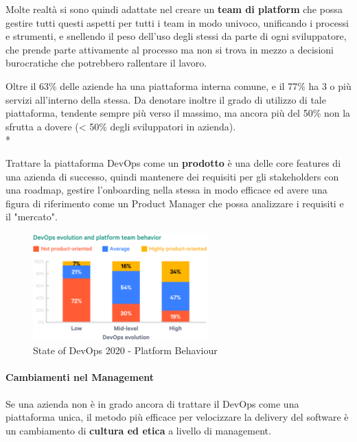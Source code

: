 \documentclass[a4paper,12pt]{report}
\begin{document}
	        Molte realtà si sono quindi adattate nel creare un \textbf{team di platform} che possa gestire tutti questi aspetti per tutti i team in modo univoco, unificando i processi e strumenti, e snellendo il peso dell'uso degli stessi da parte di ogni sviluppatore, che prende parte attivamente al processo ma non si trova in mezzo a decisioni burocratiche che potrebbero rallentare il lavoro.
	        
	        Oltre il 63\% delle aziende ha una piattaforma interna comune, e il 77\% ha 3 o più servizi all'interno della stessa. Da denotare inoltre il grado di utilizzo di tale piattaforma, tendente sempre più verso il massimo, ma ancora più del 50\% non la sfrutta a dovere (< 50\% degli sviluppatori in azienda).\\*
	        
	        Trattare la piattaforma DevOps come un \textbf{prodotto} è una delle core features di una azienda di successo, quindi mantenere dei requisiti per gli stakeholders con una roadmap, gestire l'onboarding nella stessa in modo efficace ed avere una figura di riferimento come un Product Manager che possa analizzare i requisiti e il "mercato".
	        
	        \begin{figure}[h]
				\centering
				\includegraphics[width=0.6\textwidth]{devops_product_evolution}
				\caption{State of DevOps 2020 - Platform Behaviour}
				\label{fig:devops_product_evolution}
			\end{figure}
	        
	        \paragraph{Cambiamenti nel Management}
	        Se una azienda non è in grado ancora di trattare il DevOps come una piattaforma unica, il metodo più efficace per velocizzare la delivery del software è un cambiamento di \textbf{cultura ed etica} a livello di management.
	        
\end{document}
